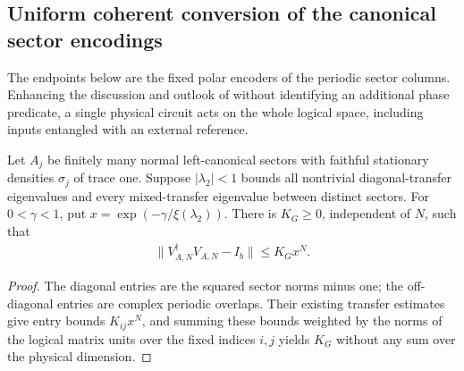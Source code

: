 \subsection{Uniform coherent conversion of the canonical sector encodings}
\label{sec:ldp_coherent_groundspace_conversion}

The endpoints below are the fixed polar encoders of the periodic
sector columns. Enhancing the discussion and outlook of
\cite{Malz2024Preparation} without identifying an additional phase predicate, a single physical circuit acts on the whole logical
space, including inputs entangled with an external reference.

\begin{lemma}
    \label{thm:ldp_sector_gram_rate}
    \leanok
    Let $A_j$ be finitely many normal left-canonical sectors with faithful
    stationary densities $\sigma_j$ of trace one. Suppose $|\lambda_2|<1$
    bounds all nontrivial diagonal-transfer eigenvalues and every
    mixed-transfer eigenvalue between distinct sectors. For $0<\gamma<1$,
    put $x=\exp(-\gamma/\xi(\lambda_2))$. There is $K_G\ge0$, independent
    of $N$, such that
    \begin{align*}
        \|V_{A,N}^\dagger V_{A,N}-I_b\|\le K_G x^N.
    \end{align*}
\end{lemma}
\begin{proof}\leanok
    The diagonal entries are the squared sector norms minus one; the
    off-diagonal entries are complex periodic overlaps. Their existing
    transfer estimates give entry bounds $K_{ij}x^N$, and summing these bounds
    weighted by the norms of the logical matrix units over the fixed
    indices $i,j$ yields $K_G$ without any sum over the physical dimension.
\end{proof}

